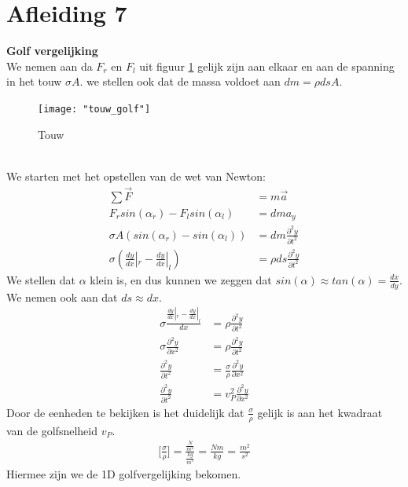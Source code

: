\documentclass[a4paper,kul]{kulakarticle} %
\begin{document}
\section{Afleiding 7}
\textbf{Golf vergelijking}\\
We nemen aan da $F_r$ en $F_l$ uit figuur \ref{fig:touwgolf} gelijk zijn aan elkaar en aan de spanning in het touw $\sigma A$. we stellen ook dat de massa voldoet aan $dm=\rho dsA$.\\
\begin{figure}[htbp]
	\centering
	\texttt{[image: "touw\_golf"]}
	\caption[Touw]{Touw}
	\label{fig:touwgolf}
\end{figure}\\
We starten met het opstellen van de wet van Newton:
\begin{align*}
	\sum\vec{F}&=m\vec{a}\\
	F_rsin(\alpha_r) - F_lsin(\alpha_l) & = dma_y\\
	\sigma A(sin(\alpha_r)-sin(\alpha_l)) & = dm\frac{\partial^2y}{\partial t^2}\\
	\sigma(\frac{dy}{dx}|_r-\frac{dy}{dx}|_l) & = \rho ds \frac{\partial^2y}{\partial t^2}
\end{align*}
We stellen dat $\alpha$ klein is, en dus kunnen we zeggen dat $sin(\alpha)\approx tan(\alpha) = \frac{dx}{dy}$. We nemen ook aan dat $ds \approx dx$.
\begin{align*}
	\sigma\frac{\frac{dy}{dx}|_r-\frac{dy}{dx}|_l}{dx} & = \rho \frac{\partial^2y}{\partial t^2}\\
	\sigma\frac{\partial^2y}{\partial x^2} & = \rho \frac{\partial^2y}{\partial t^2}\\
	\frac{\partial^2y}{\partial t^2} & = \frac{\sigma}{\rho}\frac{\partial^2y}{\partial x^2}\\
	\frac{\partial^2y}{\partial t^2} & = v_P^2\frac{\partial^2y}{\partial x^2}
\end{align*}
Door de eenheden te bekijken is het duidelijk dat $\frac{\sigma}{\rho}$ gelijk is aan het kwadraat van de golfsnelheid $v_P$.
\begin{align*}
	\bigg[\frac{\sigma}{\rho}\bigg]=\frac{\frac{N}{m^2}}{\frac{kg}{m^3}}=\frac{Nm}{kg}=\frac{m^2}{s^2}
\end{align*}
Hiermee zijn we de 1D golfvergelijking bekomen.
\newpage
\end{document}
